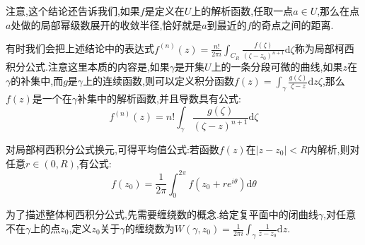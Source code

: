 注意,这个结论还告诉我们,如果$f$是定义在$U$上的解析函数,任取一点$a\in U$,那么在点$a$处做的局部幂级数展开的收敛半径,恰好就是$a$到最近的$f$的奇点之间的距离.

有时我们会把上述结论中的表达式$f^{(n)}(z)=\frac{n!}{2\pi i}\int_{C_R}\frac{f(\zeta)}{(\zeta-z_0)^{n+1}}\mathrm{d}\zeta$称为局部柯西积分公式.注意这里本质的内容是,如果$\gamma$是开集$U$上的一条分段可微的曲线,如果$z$在$\gamma$的补集中,而$g$是$\gamma$上的连续函数,则可以定义积分函数$f(z)=\int_{\gamma}\frac{g(\zeta)}{\zeta-z}\mathrm{d}z\zeta$,那么$f(z)$是一个在$\gamma$补集中的解析函数,并且导数具有公式:$$f^{(n)}(z)=n!\int_{\gamma}\frac{g(\zeta)}{(\zeta-z)^{n+1}}\mathrm{d}\zeta$$

对局部柯西积分公式换元,可得平均值公式:若函数$f(z)$在$|z-z_0|<R$内解析,则对任意$r\in(0,R)$,有公式:$$f(z_0)=\frac{1}{2\pi}\int_0^{2\pi}f(z_0+re^{i\theta})\mathrm{d}\theta$$

为了描述整体柯西积分公式,先需要缠绕数的概念.给定复平面中的闭曲线$\gamma$,对任意不在$\gamma$上的点$z_0$,定义$z_0$关于$\gamma$的缠绕数为$W(\gamma,z_0)=\frac{1}{2\pi i}\int_{\gamma}\frac{1}{z-z_0}\mathrm{d}z$.

